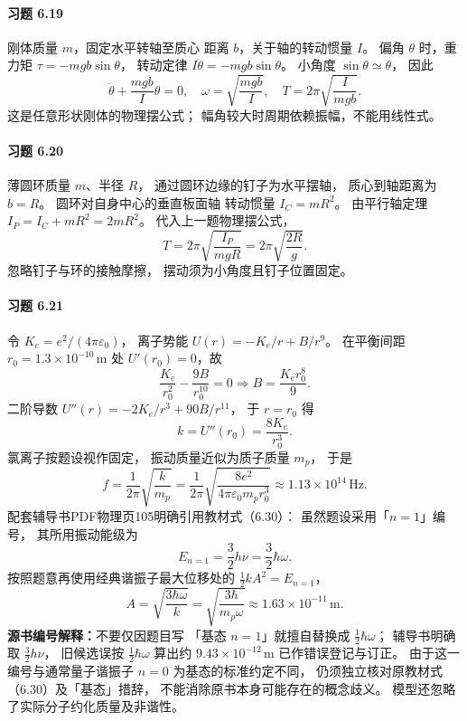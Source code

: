 \paragraph{习题 6.19}
刚体质量 \(m\)，固定水平转轴至质心
距离 \(b\)，关于轴的转动惯量 \(I\)。
偏角 \(\theta\) 时，重力矩
\(\tau=-mgb\sin\theta\)，
转动定律
\(I\ddot\theta=-mgb\sin\theta\)。
小角度 \(\sin\theta\simeq\theta\)，
因此
\[
 \boxed{\ddot\theta+\frac{mgb}{I}\theta=0},\quad
 \boxed{\omega=\sqrt{\frac{mgb}{I}}},\quad
 \boxed{T=2\pi\sqrt{\frac{I}{mgb}}}.
\]
这是任意形状刚体的物理摆公式；
幅角较大时周期依赖振幅，不能用线性式。

\paragraph{习题 6.20}
薄圆环质量 \(m\)、半径 \(R\)，
通过圆环边缘的钉子为水平摆轴，
质心到轴距离为 \(b=R\)。
圆环对自身中心的垂直板面轴
转动惯量 \(I_C=mR^2\)。
由平行轴定理
\(I_P=I_C+mR^2=2mR^2\)。
代入上一题物理摆公式，
\[
 \boxed{T=2\pi\sqrt{\frac{I_P}{mgR}}
 =2\pi\sqrt{\frac{2R}{g}}}.
\]
忽略钉子与环的接触摩擦，
摆动须为小角度且钉子位置固定。

\paragraph{习题 6.21}
令 \(K_e=e^2/(4\pi\varepsilon_0)\)，
离子势能
\(U(r)=-K_e/r+B/r^9\)。
在平衡间距
\(r_0=1.3\times10^{-10}\,\mathrm m\)
处 \(U'(r_0)=0\)，故
\[
 \frac{K_e}{r_0^2}-\frac{9B}{r_0^{10}}=0
 \Longrightarrow
 \boxed{B=\frac{K_e r_0^8}{9}}.
\]
二阶导数
\(U''(r)=-2K_e/r^3+90B/r^{11}\)，
于 \(r=r_0\) 得
\[
 \boxed{k=U''(r_0)=\frac{8K_e}{r_0^3}}.
\]
氯离子按题设视作固定，
振动质量近似为质子质量 \(m_p\)，
于是
\[
 \boxed{f=\frac1{2\pi}\sqrt{\frac{k}{m_p}}
 =\frac1{2\pi}
 \sqrt{\frac{8e^2}
 {4\pi\varepsilon_0m_pr_0^3}}
 \approx1.13\times10^{14}\,\mathrm{Hz}}.
\]
配套辅导书PDF物理页105明确引用教材式（6.30）：
虽然题设采用「\(n=1\)」编号，
其所用振动能级为
\[
 E_{n=1}=\frac32 h\nu
 =\frac32\hbar\omega.
\]
按照题意再使用经典谐振子最大位移处的
\(\frac12kA^2=E_{n=1}\)，
\[
 \boxed{A=\sqrt{\frac{3\hbar\omega}{k}}
 =\sqrt{\frac{3\hbar}{m_p\omega}}
 \approx1.63\times10^{-11}\,\mathrm m}.
\]
\textbf{源书编号解释：}不要仅因题目写
「基态 \(n=1\)」就擅自替换成
\(\frac12\hbar\omega\)；
辅导书明确取 \(\frac32 h\nu\)，
旧候选误按 \(\frac12\hbar\omega\)
算出约 \(9.43\times10^{-12}\,\mathrm m\)
已作错误登记与订正。
由于这一编号与通常量子谐振子
\(n=0\) 为基态的标准约定不同，
仍须独立核对原教材式（6.30）及「基态」措辞，
不能消除原书本身可能存在的概念歧义。
模型还忽略了实际分子约化质量及非谐性。

